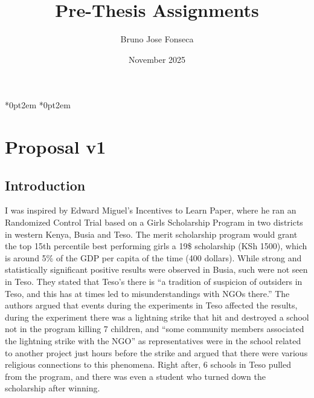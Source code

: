 \documentclass{article}
\title{Pre-Thesis Assignments}
\author{Bruno Jose Fonseca}
\date{November 2025}
\begin{document}
\titlespacing*{\section}*{0pt}{2em}
\titlespacing*{\linewidth}*{0pt}{2em}

\maketitle

\section{Proposal v1}
\subsection{Introduction}
I was inspired by Edward Miguel's Incentives to Learn Paper, where he ran an Randomized Control Trial based on a Girls Scholarship Program in two districts in western Kenya, Busia and Teso.\autocite[esp.~441]{kremer-miguel-thornton-2009} The merit scholarship program would grant the top 15th percentile best performing girls a 19\$ scholarship (KSh 1500), which is around 5\% of the GDP per capita of the time (400 dollars). \autocite[441]{kremer-miguel-thornton-2009} While strong and statistically significant positive results were observed in Busia, such were not seen in Teso. They stated that Teso's there is “a tradition of suspicion of outsiders in Teso, and this has at times led to misunderstandings with NGOs there.”\autocite[441]{kremer-miguel-thornton-2009}  The authors argued that events during the experiments in Teso affected the results, during the experiment there was a lightning strike that hit and destroyed a school not in the program killing 7 children, and “some community members associated the lightning strike with the NGO” as representatives were in the school related to another project just hours before the strike and argued that there were various religious connections to this phenomena. Right after, 6 schools in Teso pulled from the program, and there was even a student who turned down the scholarship after winning. 
\end{document}
